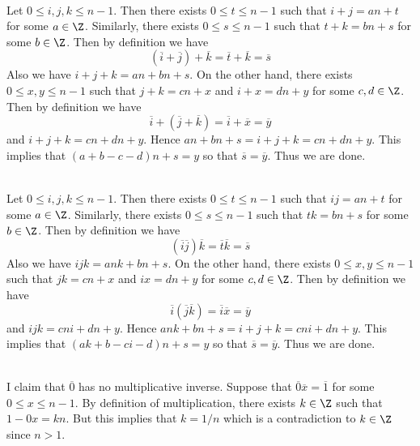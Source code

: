 \documentclass[a4paper]{article}
\begin{document}
\begin{ex}{}{}\\
Let $0\leq i,j,k\leq n-1$. Then there exists $0\leq t\leq n-1$ such that $i+j=an+t$ for some $a\in\Z$. Similarly, there exists $0\leq s\leq n-1$ such that $t+k=bn+s$ for some $b\in\Z$. Then by definition we have $$(\overline{i}+\overline{j})+\overline{k}=\overline{t}+\overline{k}=\overline{s}$$ Also we have $i+j+k=an+bn+s$. On the other hand, there exists $0\leq x,y\leq n-1$ such that $j+k=cn+x$ and $i+x=dn+y$ for some $c,d\in\Z$. Then by definition we have $$\overline{i}+(\overline{j}+\overline{k})=\overline{i}+\overline{x}=\overline{y}$$ and $i+j+k=cn+dn+y$. Hence $an+bn+s=i+j+k=cn+dn+y$. This implies that $(a+b-c-d)n+s=y$ so that $\overline{s}=\overline{y}$. Thus we are done. 
\end{ex}

\begin{ex}{}{}\\
Let $0\leq i,j,k\leq n-1$. Then there exists $0\leq t\leq n-1$ such that $ij=an+t$ for some $a\in\Z$. Similarly, there exists $0\leq s\leq n-1$ such that $tk=bn+s$ for some $b\in\Z$. Then by definition we have $$(\overline{i}\overline{j})\overline{k}=\overline{t}\overline{k}=\overline{s}$$ Also we have $ijk=ank+bn+s$. On the other hand, there exists $0\leq x,y\leq n-1$ such that $jk=cn+x$ and $ix=dn+y$ for some $c,d\in\Z$. Then by definition we have $$\overline{i}(\overline{j}\overline{k})=\overline{i}\overline{x}=\overline{y}$$ and $ijk=cni+dn+y$. Hence $ank+bn+s=i+j+k=cni+dn+y$. This implies that $(ak+b-ci-d)n+s=y$ so that $\overline{s}=\overline{y}$. Thus we are done. 
\end{ex}

\begin{ex}{}{}\\
I claim that $\overline{0}$ has no multiplicative inverse. Suppose that $\overline{0}\overline{x}=\overline{1}$ for some $0\leq x\leq n-1$. By definition of multiplication, there exists $k\in\Z$ such that $1-0x=kn$. But this implies that $k=1/n$ which is a contradiction to $k\in\Z$ since $n>1$. 
\end{ex}

\subsection{}
\subsection{}
\end{document}
